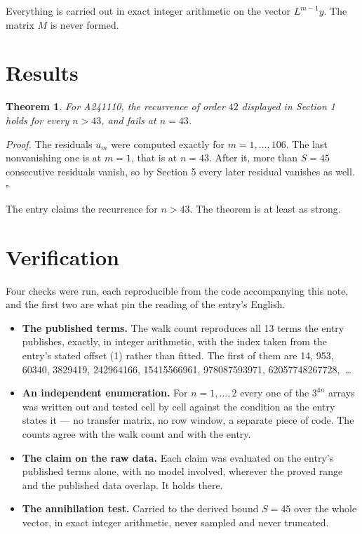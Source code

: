 \documentclass[11pt]{article}
\newtheorem{theorem}{Theorem}
\theoremstyle{definition}
\begin{document}
Everything is carried out in exact integer arithmetic on the vector $L^{m-1}y$. The matrix $M$ is never formed.

\section{Results}

\begin{theorem} For A241110, the recurrence of order $42$ displayed in Section 1 holds for every $n > 43$, and fails at $n = 43$.\end{theorem}

{\itshape Proof.} The residuals $u_m$ were computed exactly for $m = 1,\dots,106$. The last nonvanishing one is at $m = 1$, that is at $n = 43$. After it, more than $S = 45$ consecutive residuals vanish, so by Section 5 every later residual vanishes as well. $\square$

The entry claims the recurrence for $n > 43$. The theorem is at least as strong.

\section{Verification}

Four checks were run, each reproducible from the code accompanying this note, and the first two are what pin the reading of the entry's English.

\begin{itemize}

\item {\bfseries The published terms.} The walk count reproduces all 13 terms the entry publishes, exactly, in integer arithmetic, with the index taken from the entry's stated offset (1) rather than fitted. The first of them are 14, 953, 60340, 3829419, 242964166, 15415566961, 978087593971, 62057748267728,~\dots

\item {\bfseries An independent enumeration.} For $n = 1,\dots,2$ every one of the $3^{4n}$ arrays was written out and tested cell by cell against the condition as the entry states it --- no transfer matrix, no row window, a separate piece of code. The counts agree with the walk count and with the entry.

\item {\bfseries The claim on the raw data.} Each claim was evaluated on the entry's published terms alone, with no model involved, wherever the proved range and the published data overlap. It holds there.

\item {\bfseries The annihilation test.} Carried to the derived bound $S = 45$ over the whole vector, in exact integer arithmetic, never sampled and never truncated.

\end{itemize}
\end{document}
